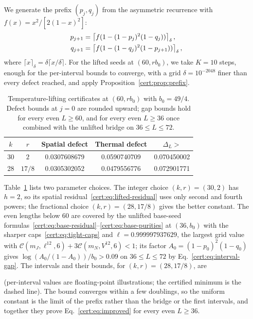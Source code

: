 We generate the prefix $(p_j,q_j)$ from the asymmetric recurrence with
$f(x)=x^2/[2(1-x)^2]$:
\begin{align}
 p_{j+1}&=\left\lceil
 f(1-(1-p_j)^2(1-q_j))\right\rceil_{\delta},\notag \\
 q_{j+1}&=\left\lceil
 f(1-(1-q_j)^2(1-p_{j+1}))\right\rceil_{\delta},
 \label{cert:eq:recurrence}
\end{align}
where $\lceil x\rceil_\delta=\delta\lceil x/\delta\rceil$.
For the lifted seeds at $(60,rb_0)$, we take $K=10$ steps, enough for
the per-interval bounds to converge, with a grid $\delta=10^{-2048}$
finer than every defect reached, and apply
Proposition~\ref{cert:prop:prefix}.

\begin{table}[t]
 \caption{Temperature-lifting certificates at $(60,rb_0)$ with $b_0=49/4$.
 Defect bounds at $j=0$ are rounded upward; gap bounds hold for every even
 $L\ge60$, and for every even $L\ge36$ once combined with the unlifted
 bridge on $36\le L\le72$.}
 \label{cert:tab:lifted}
 \begin{ruledtabular}
 \begin{tabular}{ccccc}
 $k$ & $r$ & Spatial defect & Thermal defect & $\Delta_L>$\\
 \hline
 30 & $2$    & 0.0307608679 & 0.0590740709 & 0.070450002\\
 28 & $17/8$ & 0.0305302052 & 0.0479556776 & 0.072901771
 \end{tabular}
 \end{ruledtabular}
\end{table}

Table~\ref{cert:tab:lifted} lists two parameter choices. The integer choice
$(k,r)=(30,2)$ has $h=2$, so its spatial residual~\eqref{cert:eq:lifted-residual}
uses only second and fourth powers; the fractional choice
$(k,r)=(28,17/8)$ gives the better constant. The even lengths below
$60$ are covered by the unlifted base-seed
formulas~\eqref{cert:eq:base-residual}--\eqref{cert:eq:base-purities}
at $(36,b_0)$ with the sharper caps~\eqref{cert:eq:tight-caps} and
$\ell=0.999997937629$, the largest grid value with
$\mathcal C(m_J,\ell^{12},6)+3\mathcal C(m_N,V^{12},6)<1$; its factor
$A_0=(1-p_0)^2(1-q_0)$ gives $\log(A_0/(1-A_0))/b_0>0.09$ on
$36\le L\le72$ by Eq.~\eqref{cert:eq:interval-gap}. The intervals and
their bounds, for $(k,r)=(28,17/8)$, are
\begin{proofdiagram}
 \coveragefigure
\end{proofdiagram}
(per-interval values are floating-point illustrations; the certified
minimum is the dashed line). The bound converges within a few doublings,
so the uniform constant is the limit of the prefix rather than the
bridge or the first intervals, and together they prove
Eq.~\eqref{cert:eq:improved} for every even $L\ge36$.

